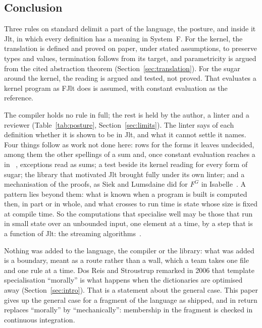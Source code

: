 \subsection{Conclusion}
\label{sec:conclusion}

Three rules on standard  delimit a part of the language, the posture, and inside it Jlt, in which every definition has a meaning in System~F.
For the kernel, the translation is defined and proved on paper, under stated assumptions, to preserve types and values, termination follows from its target, and parametricity is argued from the cited abstraction theorem (Section~\ref{sec:translation}).
For the sugar around the kernel, the reading is argued and tested, not proved.
That \Cpp{} evaluates a kernel program as FJlt does is assumed, with constant evaluation as the reference.

The compiler holds no rule in full; the rest is held by the author, a linter and a reviewer (Table~\ref{tab:posture}, Section~\ref{sec:limits}).
The linter says of each definition whether it is shown to be in Jlt, and what it cannot settle it names.
Four things follow as work not done here: rows for the forms it leaves undecided, among them the other spellings of a sum and, once constant evaluation reaches a  in ~\cite{dusikova2024p3068}, exceptions read as sums; a test beside its kernel reading for every form of sugar; the library that motivated Jlt brought fully under its own linter; and a mechanisation of the proofs, as Siek and Lumsdaine did for $F^G$ in Isabelle~\cite{siek2004formalization}.
A pattern lies beyond them: what is known when a program is built is computed then, in part or in whole, and what crosses to run time is state whose size is fixed at compile time.
So the computations that specialise well may be those that run in small state over an unbounded input, one element at a time, by a step that is a function of Jlt: the streaming algorithms~\cite{alon1999space}.

Nothing was added to the language, the compiler or the library: what was added is a boundary, meant as a route rather than a wall, which a team takes one file and one rule at a time.
Dos Reis and Stroustrup remarked in 2006 that template specialisation ``morally'' is what happens when the dictionaries are optimised away (Section~\ref{sec:intro}).
That is a statement about the general case.
This paper gives up the general case for a fragment of the language as shipped, and in return replaces ``morally'' by ``mechanically'': membership in the fragment is checked in continuous integration.
